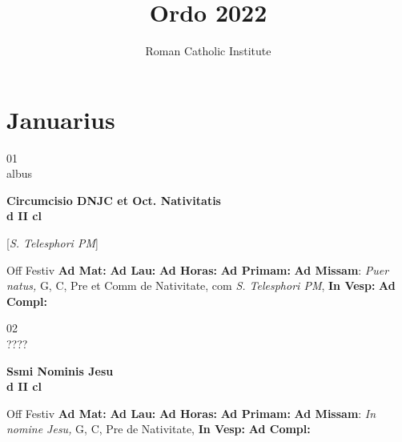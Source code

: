 \documentclass[10pt, openany]{book}
\title{Ordo 2022}
\author{Roman Catholic Institute}
\begin{document}
    \maketitle
    \clearpage\begingroup\pagestyle{empty}\cleardoublepage\endgroup

    \chapter{Januarius}
                    
    \begin{center}
        \begin{minipage}{3.5in}
            \vspace{2em}
            \begin{minipage}{0.5in}
                {\Huge 01} \\
                {\normalsize albus}
            \end{minipage}
            \begin{minipage}{3.0in}
                \textbf{ \large Circumcisio DNJC et Oct. Nativitatis \\
                \textnormal{\normalsize d II cl}}

[\textit{S. Telesphori PM}]

            \end{minipage}
            \begin{justify}Off Festiv
                \textbf{Ad Mat: }
                \textbf{Ad Lau: }
                \textbf{Ad Horas: }
                \textbf{Ad Primam: }\textbf{Ad Missam}: \textit{Puer natus,} G, C, Pre et Comm de Nativitate, com \textit{S. Telesphori PM}, 
                \textbf{In Vesp: }
                \textbf{Ad Compl: }
            \end{justify}
        \end{minipage}
    \end{center}

    \begin{center}
        \begin{minipage}{3.5in}
            \vspace{2em}
            \begin{minipage}{0.5in}
                {\Huge 02} \\
                {\normalsize ????}
            \end{minipage}
            \begin{minipage}{3.0in}
                \textbf{ \large Ssmi Nominis Jesu \\
                \textnormal{\normalsize d II cl}}

            \end{minipage}
            \begin{justify}Off Festiv
                \textbf{Ad Mat: }
                \textbf{Ad Lau: }
                \textbf{Ad Horas: }
                \textbf{Ad Primam: }\textbf{Ad Missam}: \textit{In nomine Jesu,} G, C, Pre de Nativitate, 
                \textbf{In Vesp: }
                \textbf{Ad Compl: }
            \end{justify}
        \end{minipage}
    \end{center}
\end{document}
